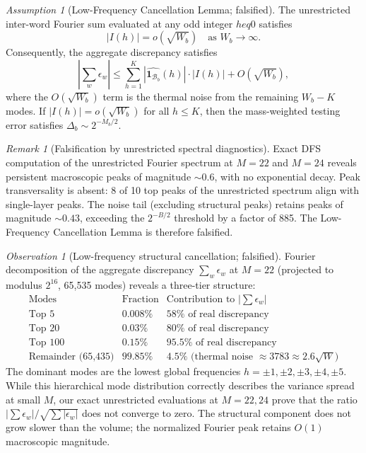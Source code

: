 \documentclass[12pt,a4paper]{article}
\theoremstyle{remark}
\newtheorem{remark}[theorem]{Remark}
\newtheorem{assumption}[theorem]{Assumption}
\newtheorem{observation}[theorem]{Observation}
\begin{document}
\begin{assumption}[Low-Frequency Cancellation Lemma; falsified]
\label{ass:low_freq_cancellation}
The unrestricted inter-word Fourier sum evaluated at any odd integer $h
eq 0$
satisfies
\[
|I(h)| = o(\sqrt{W_b}) \quad \text{as } W_b \to \infty.
\]
Consequently, the aggregate discrepancy satisfies
\[
\left|\sum_w \epsilon_w\right| \le \sum_{h=1}^{K} |\widehat{\mathbf{1}_{\mathcal{B}_b}}(h)| \cdot |I(h)| + O(\sqrt{W_b}),
\]
where the $O(\sqrt{W_b})$ term is the thermal noise from the remaining $W_b - K$ modes. If $|I(h)| = o(\sqrt{W_b})$ for all $h \le K$, then the mass-weighted testing error satisfies $\Delta_b \sim 2^{-M_b/2}$.
\end{assumption}
\begin{remark}[Falsification by unrestricted spectral diagnostics]
Exact DFS computation of the unrestricted Fourier spectrum at $M=22$ and
$M=24$ reveals persistent macroscopic peaks of magnitude $\sim 0.6$,
with no exponential decay. Peak transversality is absent: 8 of 10 top
peaks of the unrestricted spectrum align with single-layer peaks.
The noise tail (excluding structural peaks) retains peaks of magnitude
$\sim 0.43$, exceeding the $2^{-B/2}$ threshold by a factor of 885.
The Low-Frequency Cancellation Lemma is therefore falsified.
\end{remark}
\begin{observation}[Low-frequency structural cancellation; falsified]
\label{obs:low_freq_cancellation}
Fourier decomposition of the aggregate discrepancy $\sum_w \epsilon_w$ at
$M=22$ (projected to modulus $2^{16}$, 65,535 modes) reveals a three-tier structure:
\[
\begin{array}{c|c|c}
\text{Modes} & \text{Fraction} & \text{Contribution to } |\sum\epsilon_w| \\ \hline
\text{Top 5} & 0.008\% & 58\% \text{ of real discrepancy} \\
\text{Top 20} & 0.03\% & 80\% \text{ of real discrepancy} \\
\text{Top 100} & 0.15\% & 95.5\% \text{ of real discrepancy} \\
\text{Remainder (65,435)} & 99.85\% & 4.5\% \text{ (thermal noise } \approx 3783 \approx 2.6\sqrt{W}\text{)}
\end{array}
\]
The dominant modes are the lowest global frequencies $h = \pm 1, \pm 2, \pm 3, \pm 4, \pm 5$. While this hierarchical mode distribution correctly describes the variance spread at small $M$, our exact unrestricted evaluations at $M=22, 24$ prove that the ratio $|\sum\epsilon_w|/\sqrt{\sum|\epsilon_w|}$ does not converge to zero. The structural component does not grow slower than the volume; the normalized Fourier peak retains $O(1)$ macroscopic magnitude.
\end{observation}
\end{document}

